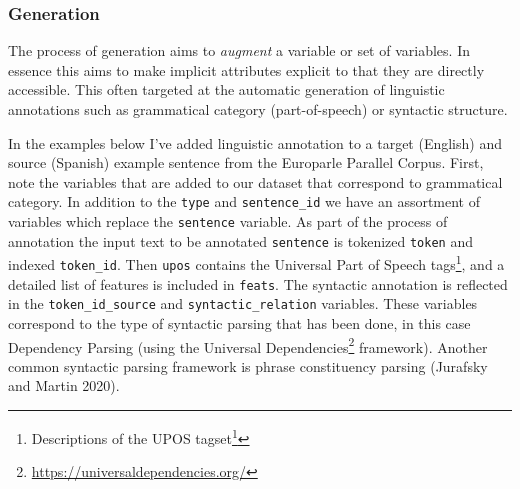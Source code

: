 \documentclass[
  letterpaper,
]{scrbook}
\DeclareRobustCommand{\href}[2]{#2\footnote{\url{#1}}}
\begin{document}
\hypertarget{generation}{%
\subsubsection{Generation}\label{generation}}

The process of generation aims to \emph{augment} a variable or set of
variables. In essence this aims to make implicit attributes explicit to
that they are directly accessible. This often targeted at the automatic
generation of linguistic annotations such as grammatical category
(part-of-speech) or syntactic structure.

In the examples below I've added linguistic annotation to a target
(English) and source (Spanish) example sentence from the Europarle
Parallel Corpus. First, note the variables that are added to our dataset
that correspond to grammatical category. In addition to the
\texttt{type} and \texttt{sentence\_id} we have an assortment of
variables which replace the \texttt{sentence} variable. As part of the
process of annotation the input text to be annotated \texttt{sentence}
is tokenized \texttt{token} and indexed \texttt{token\_id}. Then
\texttt{upos} contains the Universal Part of Speech tags\footnote{\href{https://universaldependencies.org/u/pos/}{Descriptions
  of the UPOS tagset}}, and a detailed list of features is included in
\texttt{feats}. The syntactic annotation is reflected in the
\texttt{token\_id\_source} and \texttt{syntactic\_relation} variables.
These variables correspond to the type of syntactic parsing that has
been done, in this case Dependency Parsing (using the
\href{https://universaldependencies.org/}{Universal Dependencies}
framework). Another common syntactic parsing framework is phrase
constituency parsing (Jurafsky and Martin 2020).
\end{document}
